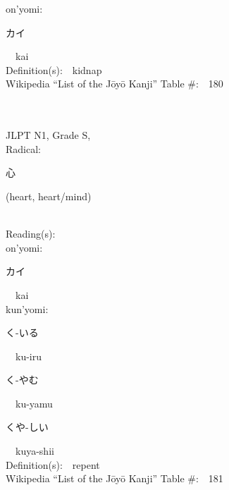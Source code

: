 \begin{multicols}{2}
{\hspace*{1em}}on'yomi:\ \ \\
{\hspace*{2em}}{\begin{CJK}{UTF8}{min} カイ \end{CJK}}\ \ kai\ \ \\
Definition(s):\ \ kidnap \\
Wikipedia ``List of the J\=oy\=o Kanji'' Table \#:\ \ 180 \\
\ \ \\
{\fontsize{34pt}{40pt}  }\ \ \\
{JLPT N1, Grade S, \\Radical:\ \ {\begin{CJK}{UTF8}{min} 心 \end{CJK}} (heart, heart/mind) } \\
Reading(s):\ \ \\
{\hspace*{1em}}on'yomi:\ \ \\
{\hspace*{2em}}{\begin{CJK}{UTF8}{min} カイ \end{CJK}}\ \ kai\ \ \\
{\hspace*{1em}}kun'yomi:\ \ \\
{\hspace*{2em}}{\begin{CJK}{UTF8}{min} く-いる \end{CJK}}\ \ ku-iru\ \ \\
{\hspace*{2em}}{\begin{CJK}{UTF8}{min} く-やむ \end{CJK}}\ \ ku-yamu\ \ \\
{\hspace*{2em}}{\begin{CJK}{UTF8}{min} くや-しい \end{CJK}}\ \ kuya-shii\ \ \\
Definition(s):\ \ repent \\
Wikipedia ``List of the J\=oy\=o Kanji'' Table \#:\ \ 181 \\
\ \ \\
{\fontsize{34pt}{40pt}  }\ \ \\  %

\end{multicols}
